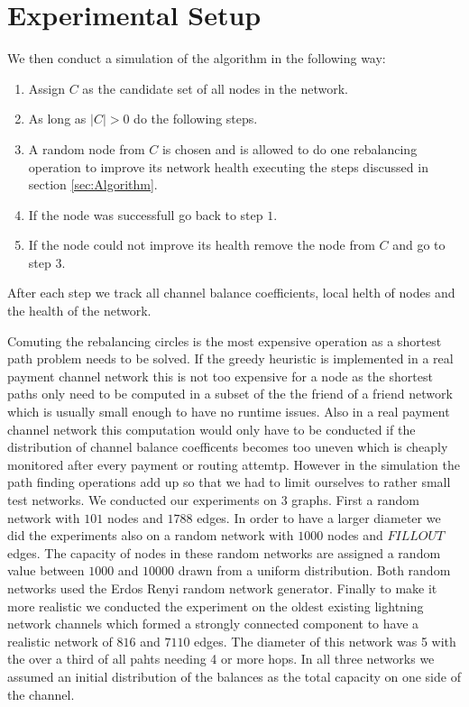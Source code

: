 \documentclass[a4paper]{paper}
\begin{document}
\section{Experimental Setup}\label{sec:setup}
We then conduct a simulation of the algorithm in the following way:
\begin{enumerate}
\item Assign $C$ as the candidate set of all nodes in the network.
\item As long as $|C| > 0$ do the following steps.
\item A random node from $C$ is chosen and is allowed to do one rebalancing operation to improve its network health executing the steps discussed in section \ref{sec:Algorithm}.
\item If the node was successfull go back to step $1$.
\item If the node could not improve its health remove the node from $C$ and go to step $3$.
\end{enumerate}
After each step we track all channel balance coefficients, local helth of nodes and the health of the network.

Comuting the rebalancing circles is the most expensive operation as a shortest path problem needs to be solved.
If the greedy heuristic is implemented in a real payment channel network this is not too expensive for a node as the shortest paths only need to be computed in a subset of the the friend of a friend network which is usually small enough to have no runtime issues.
Also in a real payment channel network this computation would only have to be conducted if the distribution of channel balance coefficents becomes too uneven which is cheaply monitored after every payment or routing attemtp.
However in the simulation the path finding operations add up so that we had to limit ourselves to rather small test networks.
We conducted our experiments on 3 graphs.
First a random network with $101$ nodes and $1788$ edges.
In order to have a larger diameter we did the experiments also on a random network with $1000$ nodes and $FILLOUT$ edges.
The capacity of nodes in these random networks are assigned a random value between $1000$ and $10000$ drawn from a uniform distribution.
Both random networks used the Erdos Renyi random network generator.
Finally to make it more realistic we conducted the experiment on the oldest existing lightning network channels which formed a strongly connected component to have a realistic network of $816$ and $7110$ edges.
The diameter of this network was 5 with the over a third of all pahts needing 4 or more hops.
In all three networks we assumed an initial distribution of the balances as the total capacity on one side of the channel.
\end{document}
